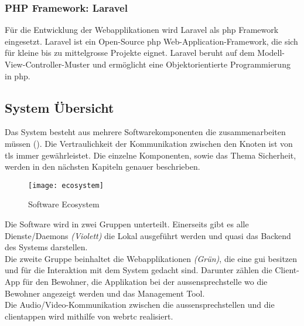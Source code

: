 \subsubsection{PHP Framework: Laravel}
Für die Entwicklung der Webapplikationen wird Laravel als \gls{php} Framework eingesetzt. Laravel ist ein Open-Source \gls{php} Web-Application-Framework, die sich für kleine bis zu mittelgrosse Projekte eignet. Laravel beruht auf dem Modell-View-Controller-Muster und ermöglicht eine Objektorientierte Programmierung in \gls{php}.

\subsection{System Übersicht}
Das System besteht aus mehrere Softwarekomponenten die zusammenarbeiten müssen (). Die  Vertraulichkeit der Kommunikation zwischen den Knoten ist von \gls{tls} immer gewährleistet. Die einzelne Komponenten, sowie das Thema Sicherheit, werden in den nächsten Kapiteln genauer beschrieben.

\begin{figure}[htb!]
	\begin{center}
		\texttt{[image: ecosystem]}
		\caption[Software Ecosystem]{Software Ecosystem}
		\label{fig:echosystem}
	\end{center}
\end{figure}

Die Software wird in zwei Gruppen unterteilt. Einerseits gibt es alle Dienste/Daemons \textit{(Violett)} die Lokal ausgeführt werden und quasi das Backend des Systems darstellen.
\\
Die zweite Gruppe beinhaltet die Webapplikationen \textit{(Grün)}, die eine \gls{gui} besitzen und für die Interaktion mit dem System gedacht sind. Darunter zählen die Client-App für den Bewohner, die Applikation bei der \gls{aussensprechstelle} wo die Bewohner angezeigt werden und das Management Tool.
\\
Die Audio/Video-Kommunikation zwischen die \gls{aussensprechstelle}n und die \gls{clientapp}en wird mithilfe von \gls{webrtc} realisiert. 

